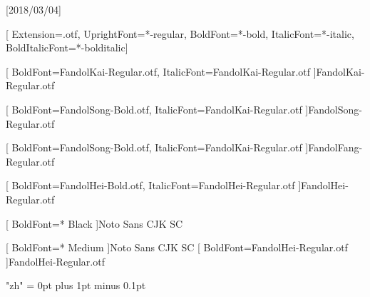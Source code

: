 
[2018/03/04]

\setsansfont{texgyreheros}[     %
Extension=.otf,
UprightFont=*-regular,
BoldFont=*-bold,
ItalicFont=*-italic,
BoldItalicFont=*-bolditalic]





[
	BoldFont=FandolKai-Regular.otf, ItalicFont=FandolKai-Regular.otf
]{FandolKai-Regular.otf}

[
	BoldFont=FandolSong-Bold.otf,
	ItalicFont=FandolKai-Regular.otf
]{FandolSong-Regular.otf}

[
	BoldFont=FandolSong-Bold.otf,
	ItalicFont=FandolKai-Regular.otf
]{FandolFang-Regular.otf}

[
	BoldFont=FandolHei-Bold.otf,
	ItalicFont=FandolHei-Regular.otf
]{FandolHei-Regular.otf}


[
	BoldFont=* Black
]{Noto Sans CJK SC}

[
	BoldFont=* Medium
]{Noto Sans CJK SC}	%
[
	BoldFont=FandolHei-Regular.otf
]{FandolHei-Regular.otf}	%

\XeTeXlinebreaklocale "zh"
\XeTeXlinebreakskip = 0pt plus 1pt minus 0.1pt

\newcommand\kaishu{\CJKfamily{kai}} %
\newcommand\songti{\CJKfamily{song}} %
\newcommand\heiti{\CJKfamily{hei}}	%
\newcommand\thmheiti{\CJKfamily{hei2}}	%
\newcommand\fangsong{\CJKfamily{fangsong}} %
\renewcommand{\em}{\bfseries\CJKfamily{emfont}} %